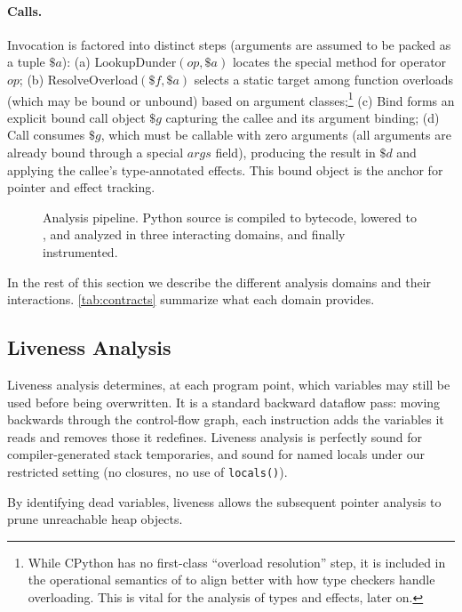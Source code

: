 \paragraph{Calls.}
Invocation is factored into distinct steps (arguments are assumed to be packed as a tuple
$\$a$): (a) \textsf{LookupDunder}$(op,\$a)$ locates the special method
for operator $op$; (b) \textsf{ResolveOverload}$(\$f,\$a)$ selects a static target among function overloads (which may be bound or unbound) based on argument classes;\footnote{While CPython has no first-class ``overload resolution'' step, it is included in the operational semantics of \spytecode to align better with how type checkers handle overloading. This is vital for the analysis of types and effects, later on.}
(c) \textsf{Bind} forms an explicit bound call object $\$g$ capturing the callee and its
argument binding; (d) \textsf{Call} consumes $\$g$, which must be callable with zero arguments (all arguments are already bound through a special $args$ field), producing the result in $\$d$ and applying the callee's type-annotated effects. This bound object is the anchor for
pointer and effect tracking.

\begin{figure}[t]
    \centering
    
    \caption{Analysis pipeline. Python source is compiled to bytecode, lowered to \spytecode, and analyzed in three interacting domains, and finally instrumented.}
    \label{fig:overview}
\end{figure}

In the rest of this section we describe the different analysis domains and their interactions. \autoref{tab:contracts} summarize what each domain provides.

\subsection{Liveness Analysis}
\label{sec:liveness}
Liveness analysis determines, at each program point, which \spytecode variables may still be used before being overwritten.  
It is a standard backward dataflow pass: moving backwards through the control-flow graph, each instruction adds the variables it reads and removes those it redefines.  Liveness analysis is perfectly sound for compiler-generated stack temporaries, and sound for named locals under our restricted setting (no closures, no use of \texttt{locals()}).

By identifying dead variables, liveness allows the subsequent pointer analysis to prune unreachable heap objects.

